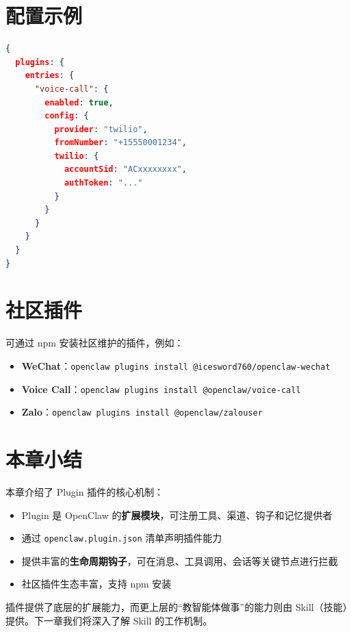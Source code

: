 \section{配置示例}

\begin{lstlisting}[language=json]
{
  plugins: {
    entries: {
      "voice-call": {
        enabled: true,
        config: {
          provider: "twilio",
          fromNumber: "+15550001234",
          twilio: {
            accountSid: "ACxxxxxxxx",
            authToken: "..."
          }
        }
      }
    }
  }
}
\end{lstlisting}

\section{社区插件}

可通过 npm 安装社区维护的插件，例如：

\begin{itemize}
  \item \textbf{WeChat}：\texttt{openclaw plugins install @icesword760/openclaw-wechat}
  \item \textbf{Voice Call}：\texttt{openclaw plugins install @openclaw/voice-call}
  \item \textbf{Zalo}：\texttt{openclaw plugins install @openclaw/zalouser}
\end{itemize}

\section{本章小结}

本章介绍了 Plugin 插件的核心机制：

\begin{itemize}
  \item Plugin 是 OpenClaw 的\textbf{扩展模块}，可注册工具、渠道、钩子和记忆提供者
  \item 通过 \texttt{openclaw.plugin.json} 清单声明插件能力
  \item 提供丰富的\textbf{生命周期钩子}，可在消息、工具调用、会话等关键节点进行拦截
  \item 社区插件生态丰富，支持 npm 安装
\end{itemize}

\noindent 插件提供了底层的扩展能力，而更上层的“教智能体做事”的能力则由 Skill（技能）提供。下一章我们将深入了解 Skill 的工作机制。
